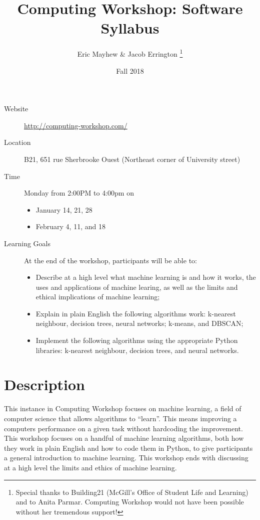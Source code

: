 \documentclass[11pt]{article}
\author{%
  Eric Mayhew \& Jacob Errington%
  \footnote{%
    Special thanks to Building21 (McGill's Office of Student Life and Learning)
    and to Anita Parmar.
    Computing Workshop would not have been possible without her tremendous
    support!
  }
}
\title{Computing Workshop: Software Syllabus}
\date{Fall 2018}
\begin{document}
\maketitle

\begin{description}
  \item[Website]
    \url{http://computing-workshop.com/}

  \item[Location]
    B21, 651 rue Sherbrooke Ouest
    (Northeast corner of University street)

  \item[Time]
    Monday from 2:00PM to 4:00pm on
    \begin{itemize}
    \item January 14, 21, 28
    \item February 4, 11, and 18
    \end{itemize}

  \item[Learning Goals]
    At the end of the workshop, participants will be able to:
    \begin{itemize}
      \item Describe at a high level what machine learning is and how it works, the uses and applications of machine learing,
        as well as the limits and ethical implications of machine learning;
      \item Explain in plain English the following algorithms work: k-nearest neighbour, decision trees, neural networks;
        k-means, and DBSCAN;
      \item Implement the following algorithms using the appropriate Python libraries: k-nearest neighbour, decision trees, and neural networks.
    \end{itemize}

\end{description}

\section*{Description}

This instance in Computing Workshop focuses on machine
learning, a field of computer science that allows algorithms to ``learn''. This
means improving a computers performance on a given task without hardcoding the
improvement. This workshop focuses on a handful of machine learning algorithms, both how they work in plain English and
how to code them in Python, to give participants a general introduction to machine learning. This workshop ends with
discussing at a high level the limits and ethics of machine learning.
\end{document}
